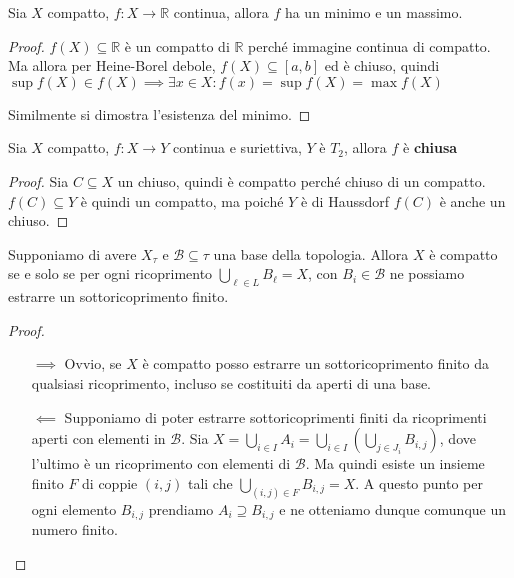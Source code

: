\begin{proposition}
    Sia \(X\) compatto, \(f: X \to \mathbb{R}\) continua, allora \(f\) ha un
    minimo e un massimo.
\end{proposition}
\begin{proof}
    \(f(X) \subseteq \mathbb{R} \) è un compatto di \(\mathbb{R}\) perché
    immagine continua di compatto. Ma allora per Heine-Borel debole, \(f(X)
    \subseteq [a, b] \) ed è chiuso, quindi \(\sup f(X) \in f(X) \implies
    \exists x \in X: f(x) = \sup f(X) = \max f(X)\) 

    Similmente si dimostra l'esistenza del minimo.
\end{proof}


\begin{proposition}
    Sia \(X\) compatto, \(f: X \to Y\) continua e suriettiva, \(Y\) è \(T_{2}\),
    allora \(f\) è \textbf{chiusa}
\end{proposition}
\begin{proof}
    Sia \(C \subseteq X \) un chiuso, quindi è compatto perché chiuso di un
    compatto. \(f(C) \subseteq  Y\) è quindi un compatto, ma poiché \(Y\) è di Haussdorf
    \(f(C)\) è anche un chiuso.
\end{proof}
\begin{lemmao}
    Supponiamo di avere \(X_\tau\) e \(\mathcal{B} \subseteq \tau \) una base della
    topologia. Allora \(X\) è compatto se e solo se per ogni ricoprimento
    \(\bigcup_{\ell \in  L} B_\ell = X\), con \(B_{i} \in \mathcal{B}\) ne possiamo
    estrarre un sottoricoprimento finito.
\end{lemmao}
\begin{proof}\( \)
\begin{itemize}
    \item[\(\implies \)] Ovvio, se \(X\) è compatto posso estrarre un
        sottoricoprimento finito da qualsiasi ricoprimento, incluso se
        costituiti da aperti di una base.
    \item[\(\impliedby \)] Supponiamo di poter estrarre sottoricoprimenti finiti
        da ricoprimenti aperti con elementi in \(\mathcal{B}\). Sia \(X =
        \bigcup_{i \in  I} A_{i} = \bigcup_{i \in  I} \left( \bigcup_{j \in
        J_{i}} B_{i, j} \right) \), dove l'ultimo è un ricoprimento con elementi
        di \(\mathcal{B}\). Ma quindi esiste un insieme finito \(F\) di coppie
        \((i, j)\) tali che \(\bigcup_{(i, j) \in F} B_{i, j} = X\). A questo
        punto per ogni elemento \(B_{i, j}\) prendiamo \(A_i \supseteq B_{i,
        j}\) e ne otteniamo dunque comunque un numero finito.
\end{itemize}
\end{proof}


